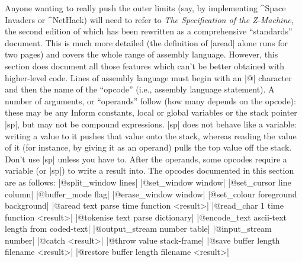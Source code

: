 {{Anyone wanting to really push the outer limits (say, by implementing
^{Space Invaders} or ^{NetHack}) will need to refer to {\sl The Specification
of the Z-Machine}, the second edition of which has been rewritten as
a comprehensive ``standards'' document.  This is much more detailed (the
definition of |aread| alone runs for two pages) and covers the whole range
of assembly language.  However, this section does document all those features
which can't be better obtained with higher-level code.
\bigskip
\noindent
Lines of assembly language must begin with an |@| character and then the
name of the ``opcode'' (i.e., assembly language statement).  A number of
arguments, or ``operands'' follow (how many depends on the opcode): these
may be any Inform constants, local or global variables or the stack pointer |sp|,
but may not be compound expressions.  |sp| does not behave like a variable:
writing a value to it pushes that value onto the stack, whereas reading
the value of it (for instance, by giving it as an operand) pulls the top
value off the stack.  Don't use |sp| unless you have to.  After the operands,
some opcodes require a variable (or |sp|) to write a result into.
The opcodes documented in this section are as follows:
\beginlines
|@split_window    lines|
|@set_window      window|
|@set_cursor      line column|
|@buffer_mode     flag|
|@erase_window    window|
|@set_colour      foreground background|
|@aread           text parse time function <result>|
|@read_char       1 time function <result>|
|@tokenise        text parse dictionary|
|@encode_text     ascii-text length from coded-text|
|@output_stream   number table|
|@input_stream    number|
|@catch           <result>|
|@throw           value stack-frame|
|@save            buffer length filename <result>|
|@restore         buffer length filename <result>|
\endlines

}}
